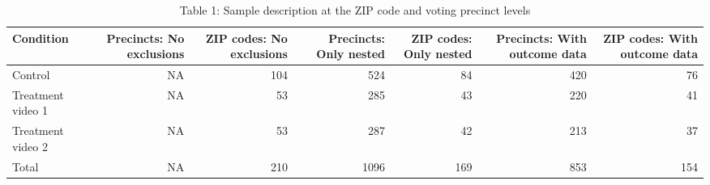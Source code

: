 \begin{table}[!h]
\centering
\caption{Table 1: Sample description at the ZIP code and voting precinct levels}
\centering
\begin{tabular}[t]{lrrrrrr}
\toprule
Condition & Precincts: No exclusions & ZIP codes: No exclusions & Precincts: Only nested & ZIP codes: Only nested & Precincts: With outcome data & ZIP codes: With outcome data\\
\midrule
Control & NA & 104 & 524 & 84 & 420 & 76\\
Treatment video 1 & NA & 53 & 285 & 43 & 220 & 41\\
Treatment video 2 & NA & 53 & 287 & 42 & 213 & 37\\
Total & NA & 210 & 1096 & 169 & 853 & 154\\
\bottomrule
\end{tabular}
\end{table}

